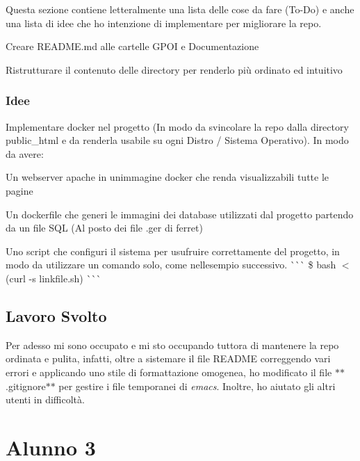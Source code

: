 Questa sezione contiene letteralmente una lista delle cose da fare (To-\/\+Do) e anche una lista di idee che ho intenzione di implementare per migliorare la repo.
\begin{DoxyItemize}
\item Creare R\+E\+A\+D\+M\+E.\+md alle cartelle G\+P\+OI e Documentazione
\item Ristrutturare il contenuto delle directory per renderlo più ordinato ed intuitivo \subsubsection*{Idee}
\end{DoxyItemize}


\begin{DoxyItemize}
\item Implementare docker nel progetto (In modo da svincolare la repo dalla directory public\+\_\+html e da renderla usabile su ogni Distro / Sistema Operativo). In modo da avere\+:
\begin{DoxyItemize}
\item Un webserver apache in un\textquotesingle{}immagine docker che renda visualizzabili tutte le pagine
\item Un dockerfile che generi le immagini dei database utilizzati dal progetto partendo da un file S\+QL (Al posto dei file .ger di ferret)
\end{DoxyItemize}
\item Uno script che configuri il sistema per usufruire correttamente del progetto, in modo da utilizzare un comando solo, come nell\textquotesingle{}esempio successivo. \`{}\`{}\`{} \$ bash $<$(curl -\/s linkfile.\+sh) \`{}\`{}\`{} \subsection*{Lavoro Svolto}
\end{DoxyItemize}

Per adesso mi sono occupato e mi sto occupando tuttora di mantenere la repo ordinata e pulita, infatti, oltre a sistemare il file R\+E\+A\+D\+ME correggendo vari errori e applicando uno stile di formattazione omogenea, ho modificato il file $\ast$$\ast$.gitignore$\ast$$\ast$ per gestire i file temporanei di {\itshape emacs}. Inoltre, ho aiutato gli altri utenti in difficoltà. \section*{Alunno 3}

